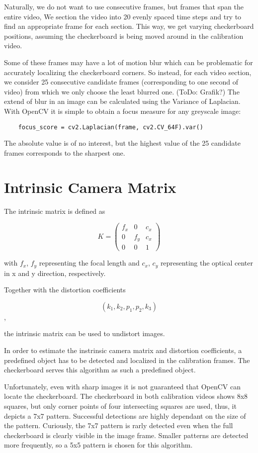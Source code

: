 \documentclass[bibliography=totoc]{scrartcl}
\begin{document}
Naturally, we do not want to use consecutive frames, but frames that span the entire video,  
We section the video into 20 evenly spaced time steps and try to find an appropriate frame for each section.
This way, we get varying checkerboard positions, assuming the checkerboard is being moved around in the calibration video.

Some of these frames may have a lot of motion blur which can be problematic for accurately localizing the checkerboard corners.
So instead, for each video section, we consider 25 consecutive candidate frames (corresponding to one second of video) from which we only choose the least blurred one. (ToDo: Grafik?)
The extend of blur in an image can be calculated using the Variance of Laplacian. \cite{BlurDetection}
With OpenCV it is simple to obtain a focus measure for any greyscale image:

\begin{lstlisting}
    focus_score = cv2.Laplacian(frame, cv2.CV_64F).var()
\end{lstlisting}

The absolute value is of no interest, but the highest value of the 25 candidate frames corresponds to the sharpest one.


\section{Intrinsic Camera Matrix}
The intrinsic matrix is defined as

$$
K =
\begin{pmatrix}
    f_x & 0 & c_x \\
    0 & f_y & c_x \\
    0 & 0 & 1
\end{pmatrix}
$$

with $f_x$, $f_y$ representing the focal length and $c_x$, $c_y$ representing the optical center in x and y direction, respectively.\cite{CameraCalibration}

Together with the distortion coefficients 

$$(k_1, k_2, p_1, p_2, k_3)$$,

the intrinsic matrix can be used to undistort images.

In order to estimate the instrinsic camera matrix and distortion coefficients, a predefined object has to be detected and localized in the calibration frames.
The checkerboard serves this algorithm as such a predefined object.

Unfortunately, even with sharp images it is not guaranteed that OpenCV can locate the checkerboard.
The checkerboard in both calibration videos shows 8x8 squares, but only corner points of four intersecting squares are used, 
thus, it depicts a 7x7 pattern.
Successful detections are highly dependant on the size of the pattern. 
Curiously, the 7x7 pattern is rarly detected even when the full checkerboard is clearly visible in the image frame.
Smaller patterns are detected more frequently, so a 5x5 pattern is chosen for this algorithm.
\end{document}
